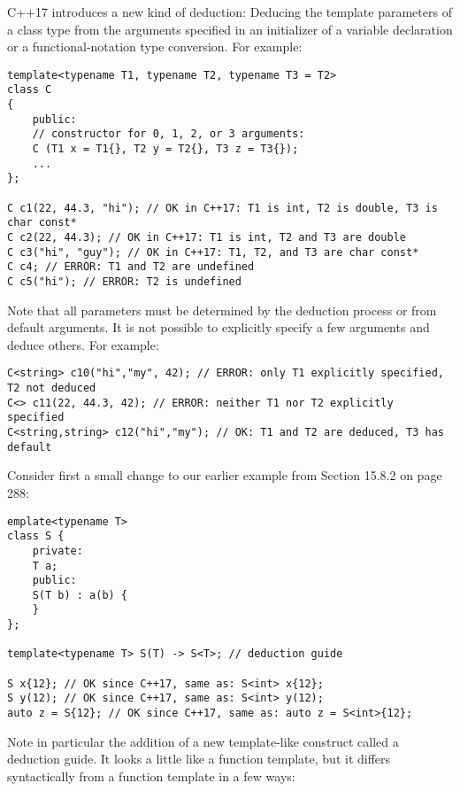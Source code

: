 
C++17 introduces a new kind of deduction: Deducing the template parameters of a class type from the arguments specified in an initializer of a variable declaration or a functional-notation type conversion. For example:

\begin{lstlisting}[style=styleCXX]
template<typename T1, typename T2, typename T3 = T2>
class C
{
	public:
	// constructor for 0, 1, 2, or 3 arguments:
	C (T1 x = T1{}, T2 y = T2{}, T3 z = T3{});
	...
};

C c1(22, 44.3, "hi"); // OK in C++17: T1 is int, T2 is double, T3 is char const*
C c2(22, 44.3); // OK in C++17: T1 is int, T2 and T3 are double
C c3("hi", "guy"); // OK in C++17: T1, T2, and T3 are char const*
C c4; // ERROR: T1 and T2 are undefined
C c5("hi"); // ERROR: T2 is undefined
\end{lstlisting}

Note that all parameters must be determined by the deduction process or from default arguments. It is not possible to explicitly specify a few arguments and deduce others. For example:

\begin{lstlisting}[style=styleCXX]
C<string> c10("hi","my", 42); // ERROR: only T1 explicitly specified, T2 not deduced
C<> c11(22, 44.3, 42); // ERROR: neither T1 nor T2 explicitly specified
C<string,string> c12("hi","my"); // OK: T1 and T2 are deduced, T3 has default
\end{lstlisting}


Consider first a small change to our earlier example from Section 15.8.2 on page 288:

\begin{lstlisting}[style=styleCXX]
emplate<typename T>
class S {
	private:
	T a;
	public:
	S(T b) : a(b) {
	}
};

template<typename T> S(T) -> S<T>; // deduction guide

S x{12}; // OK since C++17, same as: S<int> x{12};
S y(12); // OK since C++17, same as: S<int> y(12);
auto z = S{12}; // OK since C++17, same as: auto z = S<int>{12};
\end{lstlisting}

Note in particular the addition of a new template-like construct called a deduction guide. It looks a little like a function template, but it differs syntactically from a function template in a few ways:

